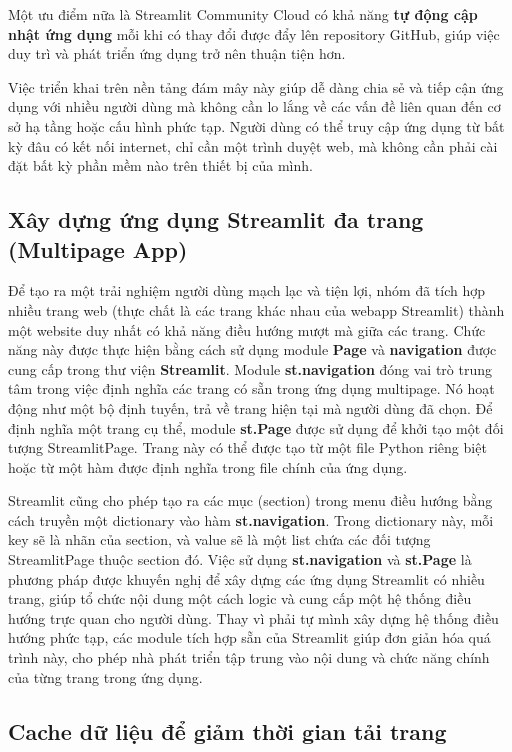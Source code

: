 Một ưu điểm nữa là Streamlit Community Cloud có khả năng \textbf{tự động cập nhật ứng dụng} mỗi khi có thay đổi được đẩy lên repository GitHub, giúp việc duy trì và phát triển ứng dụng trở nên thuận tiện hơn.

Việc triển khai trên nền tảng đám mây này giúp dễ dàng chia sẻ và tiếp cận ứng dụng với nhiều người dùng mà không cần lo lắng về các vấn đề liên quan đến cơ sở hạ tầng hoặc cấu hình phức tạp. Người dùng có thể truy cập ứng dụng từ bất kỳ đâu có kết nối internet, chỉ cần một trình duyệt web, mà không cần phải cài đặt bất kỳ phần mềm nào trên thiết bị của mình.

\subsection{Xây dựng ứng dụng Streamlit đa trang (Multipage App)}

Để tạo ra một trải nghiệm người dùng mạch lạc và tiện lợi, nhóm đã tích hợp nhiều trang web (thực chất là các trang khác nhau của webapp Streamlit) thành một website duy nhất có khả năng điều hướng mượt mà giữa các trang. Chức năng này được thực hiện bằng cách sử dụng module \textbf{Page} và \textbf{navigation} được cung cấp trong thư viện \textbf{Streamlit}. Module \textbf{st.navigation} đóng vai trò trung tâm trong việc định nghĩa các trang có sẵn trong ứng dụng multipage. Nó hoạt động như một bộ định tuyến, trả về trang hiện tại mà người dùng đã chọn. Để định nghĩa một trang cụ thể, module \textbf{st.Page} được sử dụng để khởi tạo một đối tượng StreamlitPage. Trang này có thể được tạo từ một file Python riêng biệt hoặc từ một hàm được định nghĩa trong file chính của ứng dụng.

Streamlit cũng cho phép tạo ra các mục (section) trong menu điều hướng bằng cách truyền một dictionary vào hàm \textbf{st.navigation}. Trong dictionary này, mỗi key sẽ là nhãn của section, và value sẽ là một list chứa các đối tượng StreamlitPage thuộc section đó. Việc sử dụng \textbf{st.navigation} và \textbf{st.Page} là phương pháp được khuyến nghị để xây dựng các ứng dụng Streamlit có nhiều trang, giúp tổ chức nội dung một cách logic và cung cấp một hệ thống điều hướng trực quan cho người dùng. Thay vì phải tự mình xây dựng hệ thống điều hướng phức tạp, các module tích hợp sẵn của Streamlit giúp đơn giản hóa quá trình này, cho phép nhà phát triển tập trung vào nội dung và chức năng chính của từng trang trong ứng dụng.

\subsection{Cache dữ liệu để giảm thời gian tải trang}


